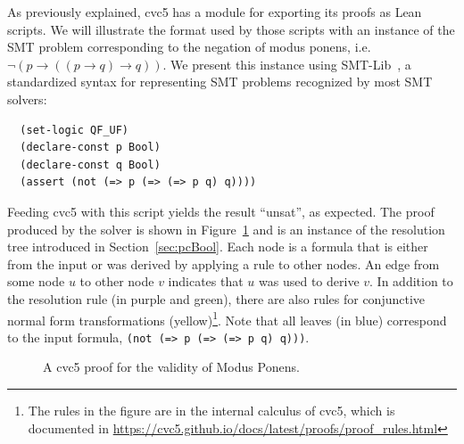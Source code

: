 As previously explained, cvc5 has a module for exporting its proofs as Lean scripts.
We will illustrate the format used by those scripts with an instance of the SMT problem corresponding
to the negation of modus ponens, i.e. $\neg (p \rightarrow ((p \rightarrow q) \rightarrow q))$.
We present this instance using SMT-Lib~\cite{smtlib}, a standardized syntax for
representing SMT problems recognized by most SMT solvers:

\begin{verbatim}
  (set-logic QF_UF)
  (declare-const p Bool)
  (declare-const q Bool)
  (assert (not (=> p (=> (=> p q) q))))
\end{verbatim}

Feeding cvc5 with this script yields the result ``unsat'', as expected. The proof produced by the solver is shown in Figure~\ref{fig:cvc5-proof} and is an instance of the resolution tree introduced in Section~\ref{sec:pcBool}.
Each node is a formula that is either from the input or was derived by applying a
rule to other nodes. An edge from some node $u$ to other node $v$ indicates that
$u$ was used to derive $v$.
In addition to the resolution rule (in purple and green), there are also rules for conjunctive normal form transformations (yellow)\footnote{The rules in the figure are in the internal calculus of cvc5, which is documented in \url{https://cvc5.github.io/docs/latest/proofs/proof_rules.html}}. Note that all leaves (in blue) correspond to the input formula, \texttt{(not (=> p (=> (=> p q) q)))}.

\makeatletter
\setlength{\@fptop}{0pt}
\makeatother

\begin{figure}[t!]
  \centering
  \caption{A cvc5 proof for the validity of Modus Ponens.}
  \label{fig:cvc5-proof}
\end{figure}

